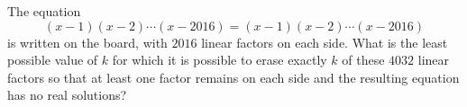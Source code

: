 The equation
$$(x-1)(x-2)\cdots(x-2016)=(x-1)(x-2)\cdots (x-2016)$$
is written on the board, with 
$2016$
 linear factors on each side. What is the least possible value of 
$k$
 for which it is possible to erase exactly 
$k$
 of these 
$4032$
 linear factors so that at least one factor remains on each side and the resulting equation has no real solutions?
